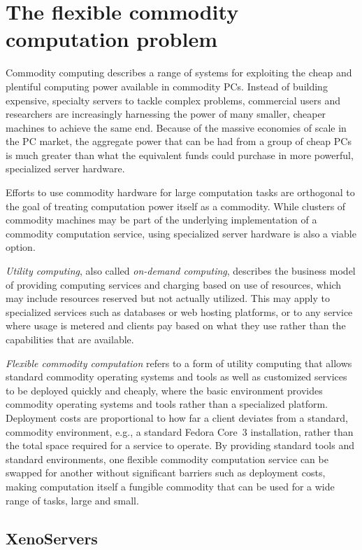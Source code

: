\section{The flexible commodity computation problem}

Commodity computing describes a range of systems for exploiting the cheap and plentiful computing power available in commodity PCs. Instead of building expensive, specialty servers to tackle complex problems, commercial users and researchers are increasingly harnessing the power of many smaller, cheaper machines to achieve the same end. Because of the massive economies of scale in the PC market, the aggregate power that can be had from a group of cheap PCs is much greater than what the equivalent funds could purchase in more powerful, specialized server hardware.

Efforts to use commodity hardware for large computation tasks are orthogonal to the goal of treating computation power itself as a commodity. While clusters of commodity machines may be part of the underlying implementation of a commodity computation service, using specialized server hardware is also a viable option.

\emph{Utility computing}, also called \emph{on-demand computing}, describes the business model of providing computing services and charging based on use of resources, which may include resources reserved but not actually utilized. This may apply to specialized services such as databases or web hosting platforms, or to any service where usage is metered and clients pay based on what they use rather than the capabilities that are available.

\emph{Flexible commodity computation} refers to a form of utility computing that allows standard commodity operating systems and tools as well as customized services to be deployed quickly and cheaply, where the basic environment provides commodity operating systems and tools rather than a specialized platform. Deployment costs are proportional to how far a client deviates from a standard, commodity environment, e.g., a standard Fedora Core~3 installation, rather than the total space required for a service to operate. By providing standard tools and standard environments, one flexible commodity computation service can be swapped for another without significant barriers such as deployment costs, making computation itself a fungible commodity that can be used for a wide range of tasks, large and small.

\subsection{XenoServers}
